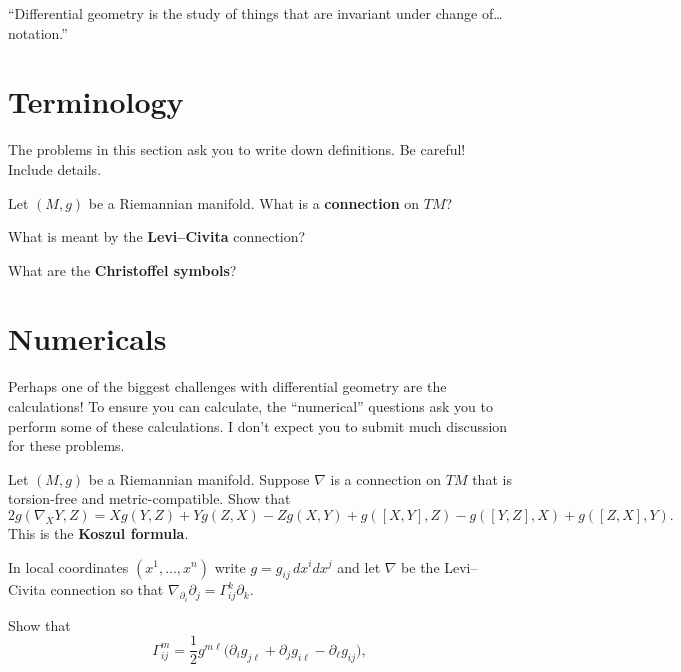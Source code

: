 \documentclass{homework}
\author{Jim Fowler}
\begin{document}
\maketitle

\begin{inspiration}
``Differential geometry is the study of things that are invariant under change of\ldots notation.''
\end{inspiration}

\section{Terminology}

{\footnotesize The problems in this section ask you to write down definitions. Be careful! Include details.}

\begin{problem}
  Let $(M,g)$ be a Riemannian manifold. 
  What is a \textbf{connection} on $TM$?
\end{problem}

\begin{problem}
  What is meant by the \textbf{Levi--Civita} connection?
\end{problem}

\begin{problem}
  What are the \textbf{Christoffel symbols}?
\end{problem}

\section{Numericals}

{\footnotesize Perhaps one of the biggest challenges with differential geometry are the calculations! To ensure you can calculate, the ``numerical'' questions ask you to perform some of these calculations. I don't expect you to submit much discussion for these problems.}

\begin{problem}
Let $(M,g)$ be a Riemannian manifold. Suppose $\nabla$ is a connection on $TM$ that is torsion-free and metric-compatible. Show that
\[
2g(\nabla_XY,Z)=Xg(Y,Z)+Yg(Z,X)-Zg(X,Y)
+g([X,Y],Z)-g([Y,Z],X)+g([Z,X],Y).
\]
This is the \textbf{Koszul formula}.
\end{problem}


\begin{problem}
  In local coordinates $(x^1,\dots,x^n)$ write $g=g_{ij}\,dx^i dx^j$ and let $\nabla$ be the Levi--Civita connection so that $\nabla_{\partial_i}\partial_j=\Gamma^k_{ij}\partial_k$.

  Show that
\[
\Gamma^m_{ij}
=\frac12 g^{m\ell}\big(\partial_i g_{j\ell}+\partial_j g_{i\ell}-\partial_\ell g_{ij}\big),
\]
\end{problem}
\end{document}
